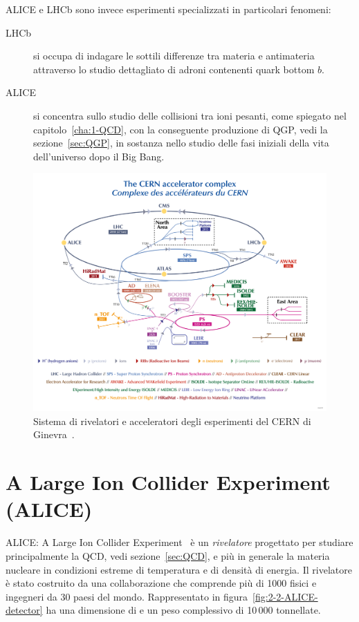     ALICE e LHCb sono invece esperimenti specializzati in particolari fenomeni:
    \begin{description}
        \item[LHCb] si occupa di indagare le sottili differenze tra materia e antimateria attraverso lo studio dettagliato di adroni contenenti quark bottom $b$.

        \item[ALICE] si concentra sullo studio delle collisioni tra ioni pesanti, come spiegato nel capitolo~\ref{cha:1-QCD}, con la conseguente produzione di QGP, vedi la sezione~\ref{sec:QGP}, in sostanza nello studio delle fasi iniziali della vita dell’universo dopo il Big Bang.
    \end{description}

    \begin{figure}[h]
        \centering
        \includegraphics[width=0.8\linewidth]{res/fig/2-chapter/1-CERN-accelerator-complex.png}
        \caption{Sistema di rivelatori e acceleratori degli esperimenti del CERN di Ginevra~\cite{Lopienska_2022}.}
        \label{fig:2-1-CERN-accelerator-complex}
    \end{figure}


\section{A Large Ion Collider Experiment (ALICE)}
    ALICE: A Large Ion Collider Experiment~\cite{ALICE_2008} è un \textit{rivelatore} progettato per studiare principalmente la QCD, vedi sezione~\ref{sec:QCD}, e più in generale la materia nucleare in condizioni estreme di temperatura e di densità di energia. Il rivelatore è stato costruito da una collaborazione che comprende più di 1000 fisici e ingegneri da 30 paesi del mondo. Rappresentato in figura~\ref{fig:2-2-ALICE-detector} ha una dimensione di  e un peso complessivo di 10\,000 tonnellate.
    
